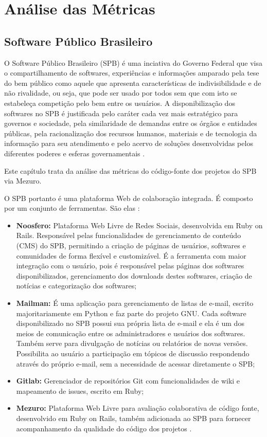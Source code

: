 \chapter{Análise das Métricas}

\section{Software Público Brasileiro}

O Software Público Brasileiro (SPB) é uma inciativa do Governo Federal que visa
o compartilhamento de softwares, experiências e informações amparado pela tese
do bem público como aquele que apresenta características de indivisibilidade e
de não rivalidade, ou seja, que pode ser usado por todos sem que com isto se
estabeleça competição pelo bem entre os usuários. A disponibilização dos
softwares no SPB é justificada pelo caráter cada vez mais estratégico para
governos e sociedade, pela similaridade de demandas entre os órgãos e entidades
públicas, pela racionalização dos recursos humanos, materiais e de tecnologia
da informação para seu atendimento e pelo acervo de soluções desenvolvidas
pelos diferentes poderes e esferas governamentais \cite{santos2011in01}.

Este capítulo trata da análise das métricas do código-fonte dos projetos do SPB
via Mezuro.

O SPB portanto é uma plataforma Web de colaboração integrada. É composto por um
conjunto de ferramentas. São elas \cite{aboutSPB}:

\begin{itemize}
  \item \textbf{Noosfero:} Plataforma Web Livre de Redes Sociais, desenvolvida
	em Ruby on Rails. Responsável pelas funcionalidades de gerenciamento de
	conteúdo (CMS) do SPB, permitindo a criação de páginas de usuários, softwares
	e comunidades de forma flexível e customizável. É a ferramenta com maior
	integração com o usuário, pois é responsável pelas páginas dos softwares
	disponibilizados, gerenciamento dos downloads destes softwares, criação de
	notícias e categorização dos softwares;
  \item \textbf{Mailman:} É uma aplicação para gerenciamento de listas de
	e-mail, escrito majoritariamente em Python e faz parte do projeto GNU. Cada
	software disponibilizado no SPB possui sua própria lista de e-mail e ela é um
	dos meios de comunicação entre os administradores e usuários dos softwares.
	Também serve para divulgação de notícias ou relatórios de novas versões.
	Possibilita ao usuário a participação em tópicos de discussão respondendo
	através do próprio e-mail, sem a necessidade de acessar diretamente o SPB;
	\item \textbf{Gitlab:} Gerenciador de repositórios Git com funcionalidades de
	wiki e mapeamento de issues, escrito em Ruby;
	\item \textbf{Mezuro:} Plataforma Web Livre para avaliação colaborativa de
	código fonte, desenvolvido em Ruby on Rails, também adicionada ao SPB para
	fornecer acompanhamento da qualidade do código dos projetos \cite{aboutSPB}.
\end{itemize}

